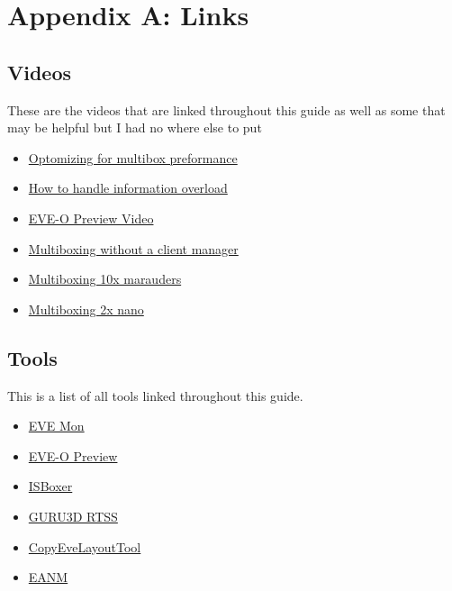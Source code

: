 \documentclass{article}
\begin{document}
\clearpage
\section*{Appendix A: Links}
\subsection*{Videos}
These are the videos that are linked throughout this guide as well as some that may be helpful but I had no where else to put
\begin{itemize}
  \item \href{https://www.youtube.com/watch?v=dKbQezW0ZwU}{Optomizing for multibox preformance}
  \item \href{https://www.youtube.com/watch?v=Lm4tVwSkBiE}{How to handle information overload}
  \item \href{https://www.youtube.com/watch?v=UpQpgcKSCS4}{EVE-O Preview Video}
  \item \href{https://www.youtube.com/watch?v=xpiYxq3mpD8}{Multiboxing without a client manager}
  \item \href{https://www.youtube.com/watch?v=iC8PwaFf8ck}{Multiboxing 10x marauders}
  \item \href{https://www.youtube.com/watch?v=p5WXd2IkaOc}{Multiboxing 2x nano}
\end{itemize}

\subsection*{Tools}
This is a list of all tools linked throughout this guide.
\begin{itemize}
  \item \href{https://evemondevteam.github.io/evemon/}{EVE Mon}
  \item \href{https://github.com/Proopai/eve-o-preview}{EVE-O Preview}
  \item \href{https://isboxer.com/}{ISBoxer}
  \item \href{https://www.guru3d.com/download/rtss-rivatuner-statistics-server-download}{GURU3D RTSS}
  \item \href{https://github.com/kshannoninnes/CopyEveLayoutTool}{CopyEveLayoutTool}
  \item \href{URLhttps://github.com/FontaineRiant/EANM}{EANM}
\end{itemize}
\end{document}
